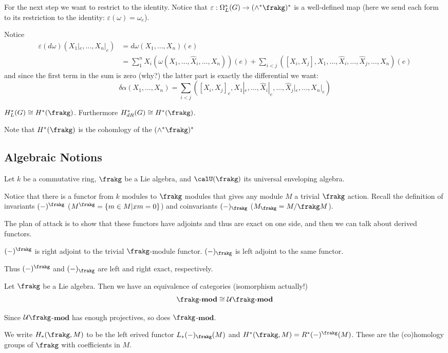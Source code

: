 \documentclass[12pt]{article}
\begin{document}
For the next step we want to restrict to the identity. Notice that $\varepsilon:\Omega_L^\ast(G)\to(\wedge^\ast\frakg)^\ast$
is a well-defined map (here we send each form to its restriction to the identity: $\varepsilon(\omega)=\omega_e$).

Notice 
\begin{align*}
	\varepsilon(d\omega)(X_1|_e,\dots,X_n|_e)&=d\omega(X_1,\dots,X_n)(e)\\
	&=\sum_1^nX_i(\omega(X_1,\dots,\hat X_i,\dots,X_n))(e)+\sum_{i<j}([X_i,X_j],X_1,\dots,\hat X_i,\dots,\hat X_j,\dots,X_n)(e)
\end{align*}
and since the first term in the sum is zero (why?) the latter part is exactly the differential we want:
\[\delta\alpha(X_1,\dots,X_n)=\sum_{i<j}([X_i,X_j]_e,X_1|_e,\dots,\hat X_i|_e,\dots,\hat X_j|_e,\dots,X_n|_e)\]

\begin{thm}
	$H_L^\ast(G)\cong H^\ast(\frakg)$. Furthermore $H_{dR}^\ast(G)\cong H^\ast(\frakg)$.
\end{thm}
\begin{rmk}
	Note that $H^\ast(\frakg)$ is the cohomlogy of the $(\wedge^\ast\frakg)^\ast$
\end{rmk}
\subsection{Algebraic Notions}
Let $k$ be a commutative ring, $\frakg$ be a Lie algebra, and $\calU(\frakg)$ its universal enveloping algebra.

Notice that there is a functor from $k$ modules to $\frakg$ modules that gives any module $M$ a trivial $\frakg$ action. Recall the definition 
of invariants $(-)^\frakg$ ($M^\frakg=\{m\in M|xm=0\}$) and coinvariants $(-)_\frakg$ ($M_\frakg=M/\frakg M$).

The plan of attack is to show that these functors have adjoints and thus are exact on one side, and then we can talk about derived functors.

\begin{lem}
	$(-)^\frakg$ is right adjoint to the trivial $\frakg$-module functor. $(-)_\frakg$ is left adjoint to the same functor.
\end{lem}
\begin{cor}
	Thus $(-)^\frakg$ and $(-)_\frakg$ are left and right exact, respectively.
\end{cor}
\begin{lem}
	Let $\frakg$ be a Lie algebra. Then we have an equivalence of categories (isomorphism actually!)
	\[\frakg\text{-}\mathbf{mod}\cong \mathcal U\frakg\text{-}\mathbf{mod}\]
\end{lem}
\begin{rmk}
	Since $\mathcal U\frakg$-$\mathbf{mod}$ has enough projectives, so does $\frakg$-$\mathbf{mod}$.
\end{rmk}
\begin{defn}
	We write $H_\ast(\frakg,M)$ to be the left erived functor $L_\ast(-)_\frakg(M)$ and $H^\ast(\frakg,M)=R^\ast(-)^\frakg(M)$.
	These are the (co)homology groups of $\frakg$ with coefficients in $M$.
\end{defn}
\end{document}
